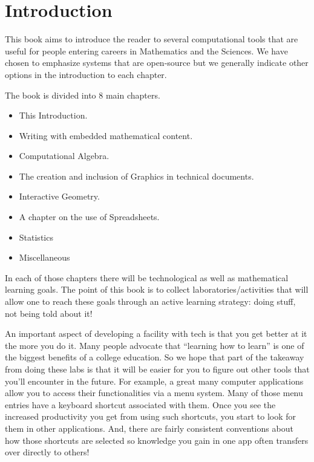  
\chapter{Introduction}

This book aims to introduce the reader to several computational tools that are useful for people entering careers in Mathematics and the Sciences.  We have chosen to emphasize systems that are open-source but we generally indicate other options in the introduction to each chapter.

The book is divided into 8 main chapters.

\begin{itemize}

\item This Introduction.

\item Writing with embedded mathematical content.

\item Computational Algebra.

\item The creation and inclusion of Graphics in technical documents.

\item Interactive Geometry.

\item A chapter on the use of Spreadsheets.

\item Statistics

\item Miscellaneous

\end{itemize}

In each of those chapters there will be technological as well as mathematical learning goals.  The point of this book is to collect laboratories/activities that will allow one to reach these goals through an active learning strategy: doing stuff, not being told about it! 

An important aspect of developing a facility with tech is that you get better at it the more you do it.  Many people advocate that ``learning how to learn'' is one of the biggest benefits of a college education.  So we hope that part of the takeaway from doing these labs is that it will be easier for you to figure out other tools that you'll encounter in the future.  For example, a great many computer applications allow you to access their functionalities via a menu system.  Many of those menu entries have a keyboard shortcut associated with them.  Once you see the increased productivity you get from using such shortcuts, you start to look for them in other applications.  And, there are fairly consistent conventions about how those shortcuts are selected so knowledge you gain in one app often transfers over directly to others!

